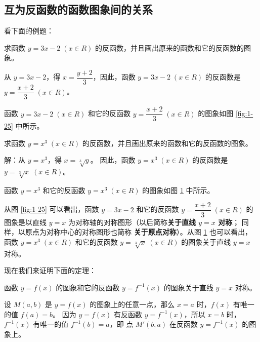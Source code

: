 \subsection{互为反函数的函数图象间的关系}\label{subsec:1-11}

看下面的例题：

\liti 求函数 $y = 3x - 2 \; (x \in R)$ 的反函数，并且画出原来的函数和它的反函数的图象。

\vspace{0.5em}
\jie 从 $y = 3x - 2$，得 $x = \dfrac {y+2}{3}$，因此，函数 $y = 3x - 2 \; (x \in R)$
的反函数是 $y = \dfrac {x+2}{3} \; (x \in R)$。

函数 $y = 3x - 2 \; (x \in R)$ 和它的反函数 $y = \dfrac {x+2}{3} \; (x \in R)$ 的图象如图 \ref{fig:1-25} 中所示。

\begin{figure}[htbp]
    \centering
    \begin{minipage}{8cm}
    \centering
    
    \caption{}\label{fig:1-25}
    \end{minipage}
    \qquad
    \begin{minipage}{8cm}
    \centering
    
    \caption{}\label{fig:1-26}
    \end{minipage}
\end{figure}

\liti 求函数 $y = x^3 \; (x \in R)$ 的反函数，并且画出原来的函数和它的反函数的图象。

解：从 $y = x^3$，得 $x = \sqrt[3]{y}$。 因此，函数 $y = x^3 \; (x \in R)$ 的反函数是 $y = \sqrt[3]{x} \; (x \in R)$。

函数  $y = x^3$ 和它的反函数 $y = x^3 \; (x \in R)$ 的图象如图 \ref{fig:1-26} 中所示。

\vspace{0.5em}
从图 \ref{fig:1-25} 可以看出，函数 $y = 3x - 2$ 和它的反函数 $y = \dfrac {x+2}{3} \; (x \in R)$
的图象是以直线 $y = x$ 为对称轴的对称图形（以后简称\textbf{关于直线 $y = x$ 对称}；
同样，以原点为对称中心的对称图形也简称 \textbf{关于原点对称}）。从图 \ref{fig:1-26} 也可以看出，
函数 $y = x^3 \; (x \in R)$ 和它的反函数 $y = \sqrt[3]{x} \; (x \in R)$ 的图象关于直线 $y = x$ 对称。

现在我们来证明下面的定理：

\begin{theorem}
    函数 $y = f(x)$ 的图象和它的反函数 $y = f^{-1}(x)$ 的图象关于直线 $y = x$ 对称。
\end{theorem}

\zhengming 设 $M(a,b)$ 是 $y = f(x)$ 的图象上的任意一点，那么 $x = a$ 时，$f(x)$ 有唯一的值 $f(a) = b$。
因为 $y = f(x)$ 有反函数 $y = f^{-1}(x)$，所以 $x = b$ 时，$f^{-1}(x)$ 有唯一的值 $f^{-1}(b) = a$，即
点 $M'(b,a)$ 在反函数 $y = f^{-1}(x)$  的图象上。


